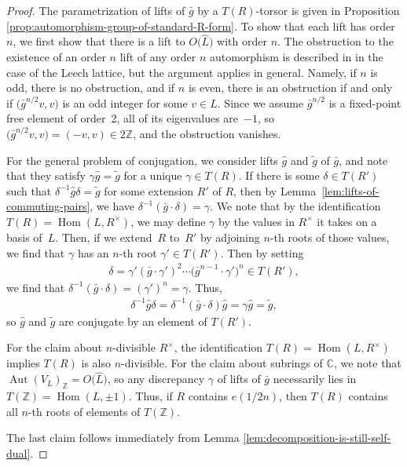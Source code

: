 \documentclass[11pt]{article}
\newcommand{\bC}{\mathbb{C}}
\newcommand{\bZ}{\mathbb{Z}}
\DeclareMathOperator{\Aut}{Aut}
\DeclareMathOperator{\Hom}{Hom}
\theoremstyle{definition}
\begin{document}
\begin{proof}
The parametrization of lifts of $\bar{g}$ by a $T(R)$-torsor is given in Proposition \ref{prop:automorphism-group-of-standard-R-form}. To show that each lift has order $n$, we first show that there is a lift to $O\big(\hat{L}\big)$ with order $n$. The obstruction to the existence of an order $n$ lift of any order $n$ automorphism is described in \cite[Lemma~12.1]{B92} in the case of the Leech lattice, but the argument applies in general. Namely, if $n$ is odd, there is no obstruction, and if $n$ is even, there is an obstruction if and only if $\big(\bar{g}^{n/2}v,v\big)$ is an odd integer for some $v \in L$. Since we assume $\bar{g}^{n/2}$ is a fixed-point free element of order~2, all of its eigenvalues are~$-1$, so $\big(\bar{g}^{n/2}v,v\big) = (-v,v) \in 2\bZ$, and the obstruction vanishes.

For the general problem of conjugation, we consider lifts $\hat{g}$ and $\tilde{g}$ of $\bar{g}$, and note that they satisfy $\gamma \hat{g} = \tilde{g}$ for a unique $\gamma \in T(R)$. If there is some $\delta \in T(R')$ such that $\delta^{-1} \hat{g} \delta = \tilde{g}$ for some extension $R'$ of $R$, then by Lemma~\ref{lem:lifts-of-commuting-pairs}, we have $\delta^{-1}(\bar{g} \cdot \delta) = \gamma$. We note that by the identification $T(R) = \Hom(L,R^\times)$, we may define $\gamma$ by the values in $R^\times$ it takes on a basis of~$L$. Then, if we extend~$R$ to~$R'$ by adjoining $n$-th roots of those values, we find that $\gamma$ has an $n$-th root $\gamma' \in T(R')$. Then by setting
\begin{gather*} \delta = \gamma' (\bar{g} \cdot \gamma')^2 \cdots \big(\bar{g}^{n-1} \cdot \gamma'\big)^n \in T(R'), \end{gather*}
we find that $\delta^{-1}(\bar{g} \cdot \delta) = (\gamma')^n = \gamma$. Thus,
\begin{gather*} \delta^{-1} \hat{g} \delta = \delta^{-1} (\bar{g} \cdot \delta) \hat{g} = \gamma \hat{g} = \tilde{g}, \end{gather*}
so $\hat{g}$ and $\tilde{g}$ are conjugate by an element of $T(R')$.

For the claim about $n$-divisible $R^\times$, the identification $T(R) = \Hom(L,R^\times)$ implies $T(R)$ is also $n$-divisible. For the claim about subrings of $\bC$, we note that $\Aut(V_L)_\bZ = O\big(\hat{L}\big)$, so any discrepancy $\gamma$ of lifts of $\bar{g}$ necessarily lies in $T(\bZ) = \Hom(L,\pm 1)$. Thus, if $R$ contains $e(1/2n)$, then $T(R)$ contains all $n$-th roots of elements of $T(\bZ)$.

The last claim follows immediately from Lemma \ref{lem:decomposition-is-still-self-dual}.
\end{proof}
\end{document}
